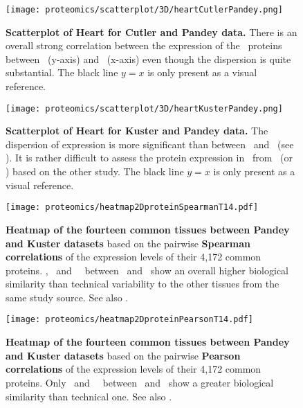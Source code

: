 \begin{figure}[!htpb]
    \texttt{[image: proteomics/scatterplot/3D/heartCutlerPandey.png]}\centering
    \caption[Heart: Cutler vs Pandey]{\label{fig:scat3DheartCutlerPandey}\textbf{%
    Scatterplot of Heart for Cutler and Pandey data.}
    There is an overall strong correlation between
    the expression of the \heart\ proteins
    between \pandey\ (y-axis) and \cutler\ (x-axis)
    even though the dispersion is quite substantial.
    {\small The black line $y=x$ is only present as a visual reference.}}
\end{figure}

\begin{figure}[!htpb]
    \texttt{[image: proteomics/scatterplot/3D/heartKusterPandey.png]}\centering
    \caption[Heart: Kuster vs Pandey]{\label{fig:scat3DheartKusterPandey}\textbf{%
    Scatterplot of Heart for Kuster and Pandey data.}
    The dispersion of expression is more significant than between \pandey\ and \cutler\
    (see ).
    It is rather difficult to assess the protein expression in \Heart\ from
    \pandey\ (or \kuster) based on the other study.
    {\small The black line $y=x$ is only present as a visual reference.}}
\end{figure}

\begin{figure}[!htpb]
    \texttt{[image: proteomics/heatmap2DproteinSpearmanT14.pdf]}\centering
    \caption[Heatmap of the 14 common tissues between Pandey and Kuster datasets
    (Spearman correlation)]{\label{fig:prot2DheatmapT14}\textbf{Heatmap of
    the fourteen common tissues between Pandey and Kuster datasets}
    based on the pairwise \textbf{Spearman correlations} of the expression levels of
    their 4,172 common proteins.
    \Placenta, \Lung\ and \Kidney\ \treps\ between \pandey\ and \kuster\ show
    an overall higher biological similarity than technical variability
    to the other tissues from the same study source.
    See also .}
\end{figure}


\begin{figure}[!htpb]
    \texttt{[image: proteomics/heatmap2DproteinPearsonT14.pdf]}\centering
    \caption[Heatmap of the 14 common tissues between Pandey and Kuster
    datasets (Pearson correlation)]{\label{fig:prot2DheatmapPearson}\textbf{Heatmap
    of the fourteen common tissues between Pandey and Kuster datasets}
    based on the pairwise \textbf{Pearson correlations} of the expression levels of
    their 4,172 common proteins.
    Only \Placenta\ and \Adrenal\ \treps\ between \pandey\ and \kuster\ show
    a greater biological similarity than technical one.
    See also .}
\end{figure}

